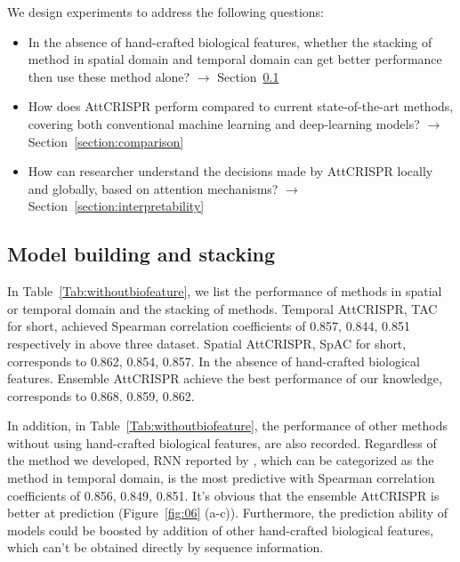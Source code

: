\documentclass{bioinfo}
\begin{document}
We design experiments to address the following questions:
\begin{itemize}
    \item 
    In the absence of hand-crafted biological features, whether the stacking of method in spatial domain and temporal domain can get better performance then use these method alone? 
    $\rightarrow$ Section~\ref{section:stacking}
    \item 
    How does AttCRISPR perform compared to current state-of-the-art methods, covering both conventional machine learning and deep-learning models? 
    $\rightarrow$ Section~\ref{section:comparison}
    \item 
    How can researcher understand the decisions made by AttCRISPR locally and globally, based on attention mechanisms? 
    $\rightarrow$ Section~\ref{section:interpretability}
    \vspace*{1pt}
\end{itemize}

\subsection{Model building and stacking}\label{section:stacking}

In Table~\ref{Tab:withoutbiofeature}, we list the performance of methods in spatial or temporal domain and the stacking of methods. 
Temporal AttCRISPR, TAC for short, achieved Spearman correlation coefficients of 0.857, 0.844, 0.851 respectively in above three dataset. 
Spatial AttCRISPR, SpAC for short, corresponds to 0.862, 0.854, 0.857. In the absence of hand-crafted biological features. 
Ensemble AttCRISPR achieve the best performance of our knowledge, corresponds to 0.868, 0.859, 0.862. 

In addition, in Table~\ref{Tab:withoutbiofeature}, the performance of other methods without using hand-crafted biological features, are also recorded. 
Regardless of the method we developed, RNN reported by \citeauthor{wang2019optimized}, which can be categorized as the method in temporal domain, 
is the most predictive with Spearman correlation coefficients of 0.856, 0.849, 0.851. 
It's obvious that the ensemble AttCRISPR is better at prediction (Figure~\ref{fig:06} (a-c)). 
Furthermore, the prediction ability of models could be boosted by addition of other hand-crafted biological features, which can't be obtained directly by sequence information. 
\end{document}
